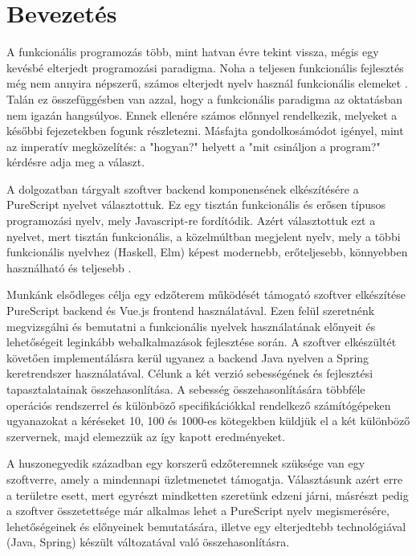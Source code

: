 \documentclass[12pt]{article}
\begin{document}
\section*{Bevezetés}

A funkcionális programozás több, mint hatvan évre tekint vissza, mégis egy kevésbé elterjedt programozási paradigma. Noha  a teljesen funkcionális fejlesztés még nem annyira népszerű, számos elterjedt nyelv használ funkcionális elemeket \cite{Java} \cite{py} \cite{cpp}. Talán ez összefüggésben van azzal, hogy a funkcionális paradigma az oktatásban nem igazán hangsúlyos. Ennek ellenére számos előnnyel rendelkezik, melyeket a későbbi fejezetekben fogunk részletezni. Másfajta gondolkosámódot igényel, mint az imperatív megközelítés: a "hogyan?" helyett a "mit csináljon a program?" kérdésre adja meg a választ.

A dolgozatban tárgyalt szoftver backend komponensének elkészítésére a PureScript nyelvet választottuk. Ez egy tisztán funkcionális és erősen típusos programozási nyelv, mely Javascript-re fordítódik. Azért választottuk ezt a nyelvet, mert tisztán funkcionális, a közelmúltban megjelent nyelv, mely a többi funkcionális nyelvhez (Haskell, Elm) képest modernebb, erőteljesebb, könnyebben használható és teljesebb \cite{CS}.

Munkánk elsődleges célja egy edzőterem működését támogató szoftver elkészítése PureScript backend és Vue.js frontend használatával. Ezen felül szeretnénk megvizsgálni és bemutatni a funkcionális nyelvek használatának előnyeit és lehetőségeit leginkább webalkalmazások fejlesztése során. A szoftver elkészültét követően implementálásra kerül ugyanez a backend Java nyelven a Spring keretrendszer használatával. Célunk a két verzió sebességének és fejlesztési tapasztalatainak összehasonlítása. A sebesség összehasonlítására többféle operációs rendszerrel és különböző specifikációkkal rendelkező számítógépeken ugyanazokat a kéréseket 10,  100 és 1000-es kötegekben küldjük el a két különböző szervernek, majd elemezzük az így kapott eredményeket.

A huszonegyedik században egy korszerű edzőteremnek szüksége van egy szoftverre, amely a mindennapi üzletmenetet támogatja. Választásunk azért erre a területre esett, mert egyrészt mindketten szeretünk edzeni járni, másrészt pedig a szoftver összetettsége már alkalmas lehet a PureScript nyelv megismerésére, lehetőségeinek és előnyeinek bemutatására, illetve egy elterjedtebb technológiával (Java, Spring) készült változatával való összehasonlításra.
\end{document}
